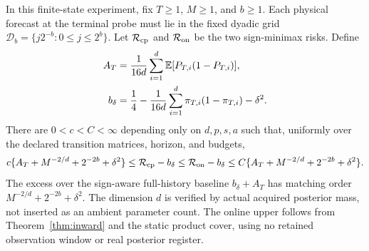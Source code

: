 \begin{theorem}\label{thm:filter}
In this finite-state experiment, fix $T\ge1$, $M\ge1$, and $b\ge1$. Each physical forecast at the terminal probe must lie in the fixed dyadic grid $\mathcal D_b=\{j2^{-b}:0\le j\le2^b\}$. Let $\mathcal R_{\mathrm{cp}}$ and $\mathcal R_{\mathrm{on}}$ be the two sign-minimax risks. Define
\begin{align}
 A_T&=\frac1{16d}\sum_{i=1}^d\mathbb E[P_{T,i}(1-P_{T,i})],\label{eq:filter-acquisition}\\
 b_\delta&=\frac14-\frac1{16d}\sum_{i=1}^d
                 \pi_{T,i}(1-\pi_{T,i})-\delta^2.\nonumber
\end{align}
There are $0<c<C<\infty$ depending only on $d,p,s,a$ such that, uniformly over the declared transition matrices, horizon, and budgets,
\begin{equation}\label{eq:filter-law}
 c\{A_T+M^{-2/d}+2^{-2b}+\delta^2\}
 \le\mathcal R_{\mathrm{cp}}-b_\delta
 \le\mathcal R_{\mathrm{on}}-b_\delta
 \le C\{A_T+M^{-2/d}+2^{-2b}+\delta^2\}.
\end{equation}
The excess over the sign-aware full-history baseline $b_\delta+A_T$ has matching order $M^{-2/d}+2^{-2b}+\delta^2$. The dimension $d$ is verified by actual acquired posterior mass, not inserted as an ambient parameter count. The online upper follows from Theorem~\ref{thm:inward} and the static product cover, using no retained observation window or real posterior register.
\end{theorem}
